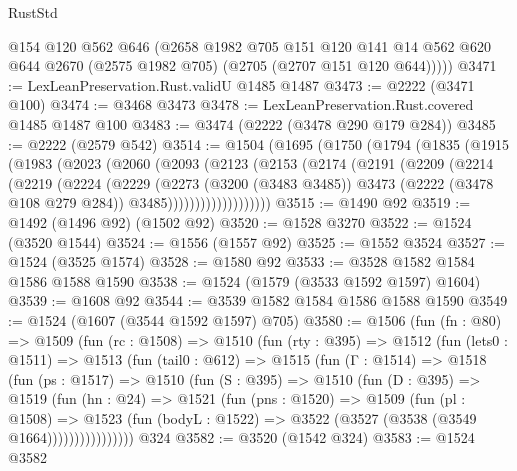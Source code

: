 \begin{lexlean}{RustStd}
\begin{coremodule}
        @154
        @120
        @562
        @646
        (@2658
          @1982
          @705
          @151
          @120
          @141
          @14
          @562
          @620
          @644
          @2670
          (@2575 @1982 @705)
          (@2705 (@2707 @151 @120 @644)))))
@3471 := LexLeanPreservation.Rust.validU @1485 @1487
@3473 := @2222 (@3471 @100)
@3474 := @3468 @3473
@3478 := LexLeanPreservation.Rust.covered @1485 @1487 @100
@3483 := @3474 (@2222 (@3478 @290 @179 @284))
@3485 := @2222 (@2579 @542)
@3514 := @1504
    (@1695
      (@1750
        (@1794
          (@1835
            (@1915
              (@1983
                (@2023
                  (@2060
                    (@2093
                      (@2123
                        (@2153
                          (@2174
                            (@2191
                              (@2209
                                (@2214
                                  (@2219
                                    (@2224
                                      (@2229
                                        (@2273
                                          (@3200 (@3483 @3485))
                                          @3473
                                          (@2222 (@3478 @108 @279 @284))
                                          @3485)))))))))))))))))))
@3515 := @1490 @92
@3519 := @1492 (@1496 @92) (@1502 @92)
@3520 := @1528 @3270
@3522 := @1524 (@3520 @1544)
@3524 := @1556 (@1557 @92)
@3525 := @1552 @3524
@3527 := @1524 (@3525 @1574)
@3528 := @1580 @92
@3533 := @3528 @1582 @1584 @1586 @1588 @1590
@3538 := @1524 (@1579 (@3533 @1592 @1597) @1604)
@3539 := @1608 @92
@3544 := @3539 @1582 @1584 @1586 @1588 @1590
@3549 := @1524 (@1607 (@3544 @1592 @1597) @705)
@3580 := @1506
    (fun (fn : @80) =>
    @1509
      (fun (rc : @1508) =>
      @1510
        (fun (rty : @395) =>
        @1512
          (fun (lets0 : @1511) =>
          @1513
            (fun (tail0 : @612) =>
            @1515
              (fun (Γ : @1514) =>
              @1518
                (fun (ps : @1517) =>
                @1510
                  (fun (S : @395) =>
                  @1510
                    (fun (D : @395) =>
                    @1519
                      (fun (hn : @24) =>
                      @1521
                        (fun (pns : @1520) =>
                        @1509
                          (fun (pl : @1508) =>
                          @1523
                            (fun (bodyL : @1522) => @3522 (@3527 (@3538 (@3549 @1664))))))))))))))))
    @324
@3582 := @3520 (@1542 @324)
@3583 := @1524 @3582

\end{coremodule}
\end{lexlean}
